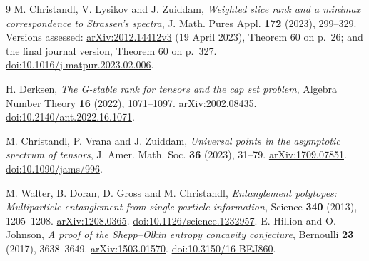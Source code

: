 \documentclass[11pt,a4paper]{article}
\begin{document}
\begin{thebibliography}{9}
M. Christandl, V. Lysikov and J. Zuiddam,
\emph{Weighted slice rank and a minimax correspondence to Strassen's spectra},
J. Math. Pures Appl. \textbf{172} (2023), 299--329.
Versions assessed: \href{https://arxiv.org/abs/2012.14412v3}{arXiv:2012.14412v3}
(19 April 2023), Theorem 60 on p.~26; and the
\href{https://dare.uva.nl/id/5f9e575f-cd5d-4316-8f0c-9320c049778f}{final journal version},
Theorem 60 on p.~327.
\href{https://doi.org/10.1016/j.matpur.2023.02.006}{doi:10.1016/j.matpur.2023.02.006}.

H. Derksen, \emph{The G-stable rank for tensors and the cap set problem},
Algebra Number Theory \textbf{16} (2022), 1071--1097.
\href{https://arxiv.org/abs/2002.08435}{arXiv:2002.08435}.
\href{https://doi.org/10.2140/ant.2022.16.1071}{doi:10.2140/ant.2022.16.1071}.

M. Christandl, P. Vrana and J. Zuiddam,
\emph{Universal points in the asymptotic spectrum of tensors},
J. Amer. Math. Soc. \textbf{36} (2023), 31--79.
\href{https://arxiv.org/abs/1709.07851}{arXiv:1709.07851}.
\href{https://doi.org/10.1090/jams/996}{doi:10.1090/jams/996}.

M. Walter, B. Doran, D. Gross and M. Christandl,
\emph{Entanglement polytopes: Multiparticle entanglement from single-particle information},
Science \textbf{340} (2013), 1205--1208.
\href{https://arxiv.org/abs/1208.0365}{arXiv:1208.0365}.
\href{https://doi.org/10.1126/science.1232957}{doi:10.1126/science.1232957}.
E. Hillion and O. Johnson,
\emph{A proof of the Shepp--Olkin entropy concavity conjecture},
Bernoulli \textbf{23} (2017), 3638--3649.
\href{https://arxiv.org/abs/1503.01570}{arXiv:1503.01570}.
\href{https://doi.org/10.3150/16-BEJ860}{doi:10.3150/16-BEJ860}.
\end{thebibliography}
\end{document}
